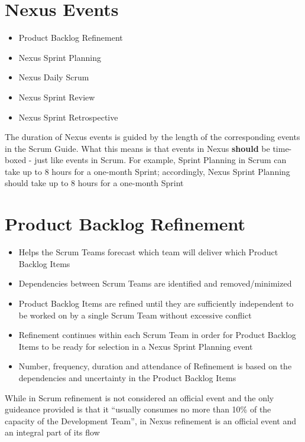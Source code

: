 \documentclass[a4paper,11pt,twocolumn]{article}
\begin{document}
\section*{Nexus Events}
\begin{itemize}
	\item Product Backlog Refinement
	\item Nexus Sprint Planning
	\item Nexus Daily Scrum
	\item Nexus Sprint Review
	\item Nexus Sprint Retrospective
\end{itemize}

\begin{tcolorbox}[colback=black!8!white,colframe=gray!50!black,title=Note,sharp corners,fonttitle=\normalsize\bfseries,fontupper=\normalsize]
	The duration of Nexus events is guided by the length of the corresponding events in the Scrum Guide. What this means is that events in Nexus \textbf{should} be time-boxed - just like events in Scrum. For example, Sprint Planning in Scrum can take up to 8 hours for a one-month Sprint; accordingly, Nexus Sprint Planning should take up to 8 hours for a one-month Sprint
\end{tcolorbox}

\section*{Product Backlog Refinement}
\begin{itemize}
	\item Helps the Scrum Teams forecast which team will deliver which Product Backlog Items
	\item Dependencies between Scrum Teams are identified and removed/minimized
	\item Product Backlog Items are refined until they are sufficiently independent to be worked on by a single Scrum Team without excessive conflict
	\item Refinement continues within each Scrum Team in order for Product Backlog Items to be ready for selection in a Nexus Sprint Planning event
	\item Number, frequency, duration and attendance of Refinement is based on the dependencies and uncertainty in the Product Backlog Items
\end{itemize}

\begin{tcolorbox}[colback=black!8!white,colframe=gray!50!black,title=Note,sharp corners,fonttitle=\normalsize\bfseries,fontupper=\normalsize]
	While in Scrum refinement is not considered an official event and the only guideance provided is that it ``usually consumes no more than 10\% of the capacity of the Development Team'', in Nexus refinement is an official event and an integral part of its flow
\end{tcolorbox}
\end{document}

